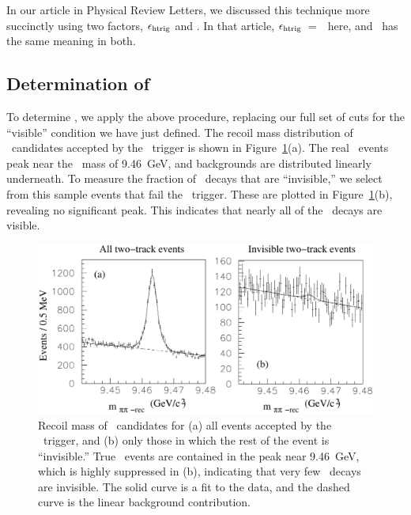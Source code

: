 \documentclass{cornell}
\begin{document}
In our article in Physical Review Letters, we discussed this technique
more succinctly using two factors, $\epsilon_{\mbox{\scriptsize htrig}}$ and \ecuts.
In that article, $\epsilon_{\mbox{\scriptsize htrig}}$~=~\evis\ here, and \ecuts\
has the same meaning in both.

\subsection{Determination of \boldmath \evis}

To determine \evis, we apply the above procedure, replacing our full
set of cuts for the ``visible'' condition we have just defined.  The
recoil mass distribution of \pipi\ candidates accepted by the
\twotrack\ trigger is shown in Figure~\ref{pipitwotrack}(a).  The real
\twotoone\ events peak near the \us\ mass of 9.46~GeV, and backgrounds
are distributed linearly underneath.  To measure the fraction of \us\
decays that are ``invisible,'' we select from this sample events that
fail the \hadron\ trigger.  These are plotted in Figure~\ref{pipitwotrack}(b), revealing no significant peak.  This indicates
that nearly all of the \us\ decays are visible.

\begin{figure}[p]
  \begin{center}
    \includegraphics[width=\linewidth]{plots/pipitwotrack}
  \end{center}
  \caption{\label{pipitwotrack} Recoil mass of \pipi\ candidates for
  (a) all events accepted by the \twotrack\ trigger, and (b) only
  those in which the rest of the event is ``invisible.''  True
  \twotoone\ events are contained in the peak near 9.46~GeV, which is
  highly suppressed in (b), indicating that very few \us\ decays are
  invisible.  The solid curve is a fit to the data, and the dashed
  curve is the linear background contribution.}
\end{figure}
\end{document}
